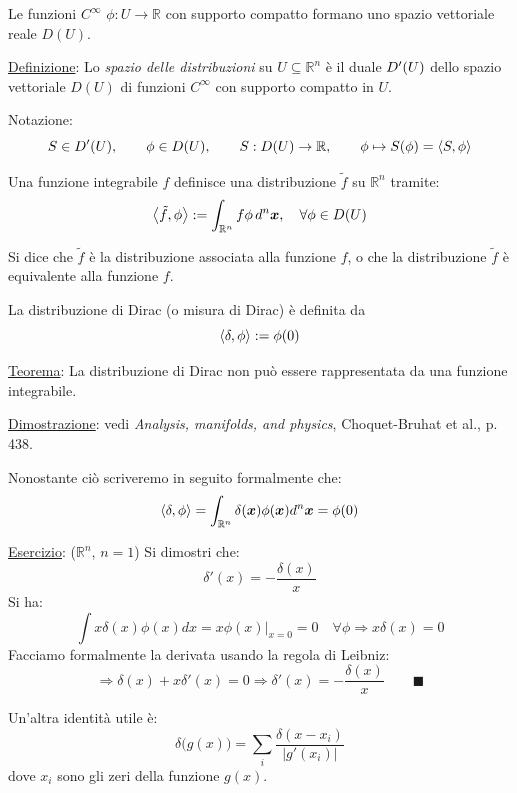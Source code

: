 \documentclass[a4paper,11pt]{report}
\newcommand{\Rn}{\mathbb{R}^n}
\newcommand{\x}{\boldsymbol{x}}
\begin{document}
Le funzioni $C^{\infty}$ $\phi :U\rightarrow \mathbb{R}$ con supporto compatto formano uno spazio vettoriale reale $D(U)$.

\medskip

\underline{Definizione}: Lo \emph{spazio delle distribuzioni} su $U \subseteq \mathbb{R}^n$ \`e il duale $D\sp\prime(U)$ dello spazio vettoriale $D(U)$ di funzioni $C^{\infty}$ con supporto compatto in $U$.

Notazione: 
\[
S \in D\sp\prime(U), \qquad
\phi \in D(U), \qquad
S : D(U)\rightarrow \mathbb{R}, \qquad 
\phi \mapsto S(\phi) = \Braket{S,\phi}
\]

Una funzione integrabile $f$ definisce una distribuzione $\tilde{f}$ su $\mathbb{R}^n$ tramite:
\begin{equation}
\Braket{\tilde{f},\phi} := \int_{\Rn} f \phi \,d^{n}\x, \quad\forall \phi \in D(U) 
\end{equation}

Si dice che $\tilde{f}$ \`e la distribuzione associata alla funzione $f$, o che la distribuzione $\tilde{f}$ \`e equivalente alla funzione $f$.

La distribuzione di Dirac (o misura di Dirac) \`e definita da 
\begin{equation}
\Braket{\delta,\phi} := \phi(0) 
\end{equation}

\underline{Teorema}: La distribuzione di Dirac non pu\`o essere rappresentata da una funzione integrabile. 

\underline{Dimostrazione}: vedi \emph{Analysis, manifolds, and physics}, Choquet-Bruhat et al., p. 438. 

\medskip

Nonostante ci\`o scriveremo in seguito formalmente che:
\begin{equation}
\Braket{\delta , \phi} = \int_{\Rn} \delta (\x) \phi(\x) d^n \x= \phi(0) 
\end{equation}

\underline{Esercizio}: ($ \mathbb{R}^n$, $n=1$) Si dimostri che:
\begin{equation}
\delta' (x) =-\frac{\delta(x)}{x}
\end{equation}
Si ha:
\[
\int x\delta(x)\phi(x)dx = x\phi(x)\Big|_{x=0}=0 \quad \forall \phi \Rightarrow x\delta(x)=0
\]
Facciamo formalmente la derivata usando la regola di Leibniz:
\[
\Rightarrow \delta(x) + x\delta'(x)=0 \Rightarrow \delta ' (x) = -\frac{\delta(x)}{x}  \qquad \blacksquare
\]

Un'altra identit\`a utile \`e:
\begin{equation}
\delta\big(g(x)\big) = \sum_{i}\frac{\delta(x-x_i)}{|g'(x_i)|} 
\end{equation} 
dove $x_i$ sono gli zeri della funzione $g(x)$.
\end{document}
